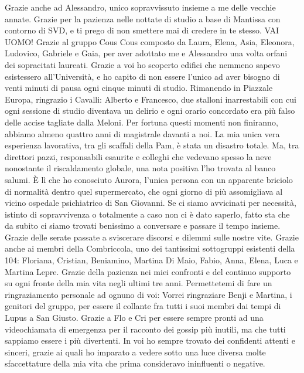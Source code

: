 \newline
Grazie anche ad Alessandro, unico sopravvissuto insieme a me delle vecchie annate. Grazie per la pazienza nelle nottate di studio a base di Mantissa con contorno di SVD, e ti prego di non smettere mai di credere in te stesso. VAI UOMO!
\newline 
Grazie al gruppo Cous Cous composto da Laura, Elena, Asia, Eleonora, Ludovico, Gabriele e Gaia, per aver adottato me e Alessandro una volta orfani dei sopracitati laureati. Grazie a voi ho scoperto edifici che nemmeno sapevo esistessero all'Università, e ho capito di non essere l'unico ad aver bisogno di venti minuti di pausa ogni cinque minuti di studio.
\newline
Rimanendo in Piazzale Europa, ringrazio i Cavalli: Alberto e Francesco, due stalloni inarrestabili con cui ogni sessione di studio diventava un delirio e ogni orario concordato era più falso delle accise tagliate dalla Meloni. Per fortuna questi momenti non finiranno, abbiamo almeno quattro anni di magistrale davanti a noi. 
\newline
La mia unica vera esperienza lavorativa, tra gli scaffali della Pam, è stata un disastro totale. Ma, tra direttori pazzi, responsabili esaurite e colleghi che vedevano spesso la neve nonostante il riscaldamento globale, una nota positiva l'ho trovata al banco salumi. È lì che ho conosciuto Aurora, l'unica persona con un apparente briciolo di normalità dentro quel supermercato, che ogni giorno di più assomigliava al vicino ospedale psichiatrico di San Giovanni. Se ci siamo avvicinati per necessità, istinto di sopravvivenza o totalmente a caso non ci è dato saperlo, fatto sta che da subito ci siamo trovati benissimo a conversare e passare il tempo insieme. Grazie delle serate passate a sviscerare discorsi e dilemmi sulle nostre vite.
\newline
Grazie anche ai membri della Combriccola, uno dei tantissimi sottogruppi esistenti della 104: Floriana, Cristian, Beniamino, Martina Di Maio, Fabio, Anna, Elena, Luca e Martina Lepre. Grazie della pazienza nei miei confronti e del continuo supporto su ogni fronte della mia vita negli ultimi tre anni. Permettetemi di fare un ringraziamento personale ad ognuno di voi:
\newline
Vorrei ringraziare Benji e Martina, i genitori del gruppo, per essere il collante fra tutti i suoi membri dai tempi di Lupus a San Giusto.
\newline
Grazie a Flo e Cri per essere sempre pronti ad una videochiamata di emergenza per il racconto dei gossip più inutili, ma che tutti sappiamo essere i più divertenti. In voi ho sempre trovato dei confidenti attenti e sinceri, grazie ai quali ho imparato a vedere sotto una luce diversa molte sfaccettature della mia vita che prima consideravo ininfluenti o negative.
